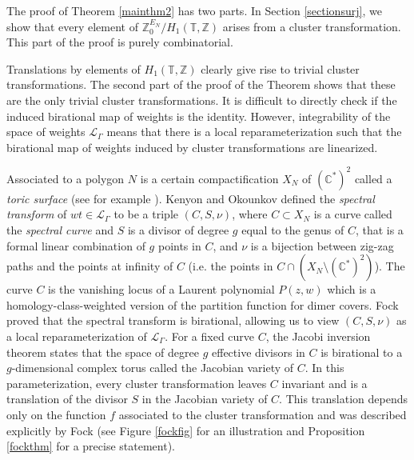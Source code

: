 \documentclass[11pt]{article} %
\theoremstyle{definition}
\newcommand{\Z}{{\mathbb Z}}
\newcommand{\C}{{\mathbb C}}
\begin{document}
The proof of Theorem \ref{mainthm2} has two parts. In Section \ref{sectionsurj}, we show that every element of $\Z^{E_N}_0/H_1(\mathbb T,\Z)$ arises from a cluster transformation. This part of the proof is purely combinatorial.

Translations by elements of $H_1(\mathbb T,\Z)$ clearly give rise to trivial cluster transformations. The second part of the proof of the Theorem shows that these are the only trivial cluster transformations. It is difficult to directly check if the induced birational map of weights is the identity. However, integrability of the space of weights $\mathcal L_\Gamma$ means that there is a local reparameterization such that the birational map of weights induced by cluster transformations are linearized. 

Associated to a polygon $N$ is a certain compactification $X_N$ of $(\C^*)^2$ called a \textit{toric surface} (see for example \cite{CLS11}).
Kenyon and Okounkov \cite{KO} defined the \textit{spectral transform} of $wt \in\mathcal L_\Gamma$ to be a triple $(C, S, \nu)$, where $C \subset X_N$ is a curve called the \textit{spectral curve} and $S$ is a divisor of degree $g$ equal to the genus of $C$, that is a formal linear combination of $g$ points in $C$, and $\nu$ is a bijection between zig-zag paths and the points at infinity of $C$ (i.e. the points in $C \cap (X_N \setminus (\C^*)^2)$). The curve $C$ is the vanishing locus of a Laurent polynomial $P(z,w)$ which is a homology-class-weighted version of the partition function for dimer covers. Fock \cites{F15} proved that the spectral transform is birational, allowing us to view $(C,S,\nu)$ as a local reparameterization of $\mathcal L_\Gamma$. For a fixed curve $C$, the Jacobi inversion theorem states that the space of degree $g$ effective divisors in $C$ is birational to a $g$-dimensional complex torus called the Jacobian variety of $C$. In this parameterization, every  cluster transformation leaves $C$ invariant and is a translation of the divisor $S$ in the Jacobian variety of $C$. This translation depends only on the function $f$ associated to the cluster transformation and was described explicitly by Fock \cite{F15} (see Figure \ref{fockfig} for an illustration and Proposition \ref{fockthm} for a precise statement). 
\end{document}
